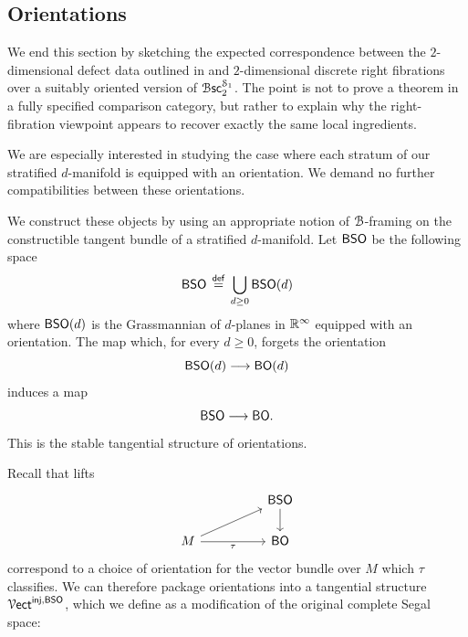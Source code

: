 \subsection{Orientations}

We end this section by sketching the expected correspondence between the $2$-dimensional defect data outlined in \cite[Definition~2.4]{CRS19} and $2$-dimensional discrete right fibrations over a suitably oriented version of $\operatorname{\mathcal B\mathsf{sc}}_2^{\mathcal S_1}$. The point is not to prove a theorem in a fully specified comparison category, but rather to explain why the right-fibration viewpoint appears to recover exactly the same local ingredients.

\begin{construction}
We are especially interested in studying the case where each stratum of our stratified $d$-manifold is equipped with an orientation. We demand no further compatibilities between these orientations. 

\medskip

\nid We construct these objects by using an appropriate notion of $\mathcal B$-framing on the constructible tangent bundle of a stratified $d$-manifold. Let $\mathsf B\mathsf S\mathsf O$ be the following space 
\begin{equation}
    \mathsf B\mathsf S\mathsf O \, \overset{\sf def}{=} \, \bigcup_{d \geq 0} \mathsf B\mathsf S\mathsf O(d)
\end{equation}
where $\mathsf B\mathsf S\mathsf O(d)$ is the Grassmannian of $d$-planes in $\mathbb R^{\operatorname{\infty}}$ equipped with an orientation. The map which, for every $d\geq 0$, forgets the orientation 
\begin{equation}
    \mathsf B\mathsf S\mathsf O(d) \longrightarrow \mathsf B\mathsf O(d)
\end{equation}
induces a map 
\begin{equation}
    \mathsf B\mathsf S\mathsf O \longrightarrow \mathsf B\mathsf O.
\end{equation}
This is the stable tangential structure of orientations.
\medskip

\nid Recall that lifts
\begin{equation}
    \begin{tikzcd}[ampersand replacement=\&]
        \&\& {\sB\sS\sO} \\
        M \&\& {\sB\sO}
        \arrow[from=1-3, to=2-3]
        \arrow[from=2-1, to=1-3]
        \arrow["\tau"', from=2-1, to=2-3]
    \end{tikzcd}
\end{equation}
correspond to a choice of orientation for the vector bundle over $M$ which $\tau$ classifies. We can therefore package orientations into a tangential structure $\operatorname{\mathcal V{\sf ect}}^{\operatorname{\mathsf{inj}}, \mathsf B\mathsf S\mathsf O}$, which we define as a modification of the original complete Segal space:


\end{construction}
